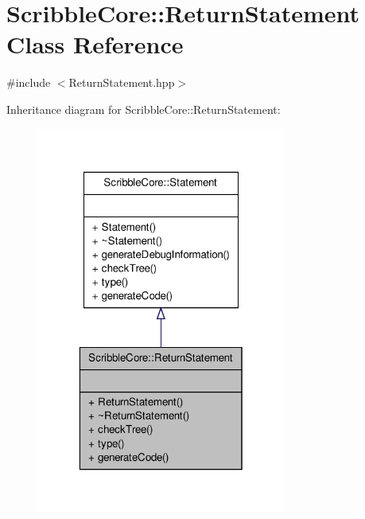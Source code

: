 \hypertarget{class_scribble_core_1_1_return_statement}{\section{Scribble\-Core\-:\-:Return\-Statement Class Reference}
\label{class_scribble_core_1_1_return_statement}
}


{\ttfamily \#include $<$Return\-Statement.\-hpp$>$}



Inheritance diagram for Scribble\-Core\-:\-:Return\-Statement\-:
\nopagebreak
\begin{figure}[H]
\begin{center}
\leavevmode
\includegraphics[width=232pt]{class_scribble_core_1_1_return_statement__inherit__graph}
\end{center}
\end{figure}


